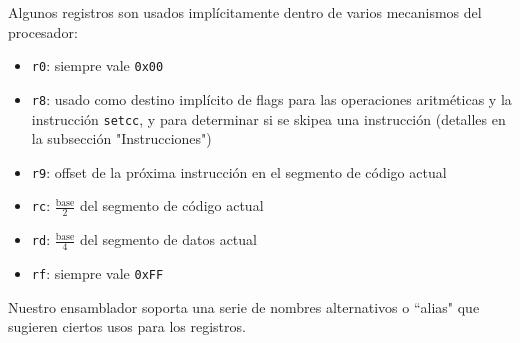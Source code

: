 \documentclass{article}
\begin{document}
Algunos registros son usados implícitamente dentro de varios mecanismos del procesador:
\begin{itemize}
    \item \texttt{r0}: siempre vale \texttt{0x00}
    \item \texttt{r8}: usado como destino implícito de flags para las operaciones aritméticas y la instrucción \texttt{setcc}, y para determinar si se skipea una instrucción (detalles en la subsección "Instrucciones")
    \item \texttt{r9}: offset de la próxima instrucción en el segmento de código actual
    \item \texttt{rc}: $\frac{\text{base}}{2}$ del segmento de código actual
    \item \texttt{rd}: $\frac{\text{base}}{4}$ del segmento de datos actual
    \item \texttt{rf}: siempre vale \texttt{0xFF}
\end{itemize}

Nuestro ensamblador soporta una serie de nombres alternativos o ``alias" que sugieren ciertos usos para los registros.
\end{document}
